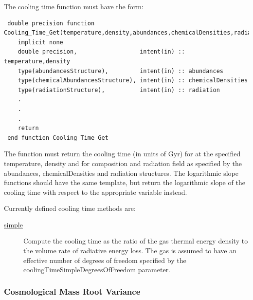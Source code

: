 The cooling time function must have the form:
\begin{verbatim}
 double precision function Cooling_Time_Get(temperature,density,abundances,chemicalDensities,radiation)
    implicit none
    double precision,                  intent(in) :: temperature,density
    type(abundancesStructure),         intent(in) :: abundances
    type(chemicalAbundancesStructure), intent(in) :: chemicalDensities
    type(radiationStructure),          intent(in) :: radiation
    .
    .
    .
    return
 end function Cooling_Time_Get
\end{verbatim}
The function must return the cooling time (in units of Gyr) for at the specified {\normalfont \ttfamily temperature}, {\normalfont \ttfamily density} and for composition and radiation field as specified by the {\normalfont \ttfamily abundances}, {\normalfont \ttfamily chemicalDensities} and {\normalfont \ttfamily radiation} structures. The logarithmic slope functions should have the same template, but return the logarithmic slope of the cooling time with respect to the appropriate variable instead.

Currently defined cooling time methods are:
\begin{description}
 \item [\hyperlink{cooling.cooling_time.simple.F90:cooling_times_simple:cooling_time_simple}{{\normalfont \ttfamily simple}}] Compute the cooling time as the ratio of the gas thermal energy density to the volume rate of radiative energy loss. The gas is assumed to have an effective number of degrees of freedom specified by the {\normalfont \ttfamily coolingTimeSimpleDegreesOfFreedom} parameter.
\end{description}

\subsubsection{Cosmological Mass Root Variance}

